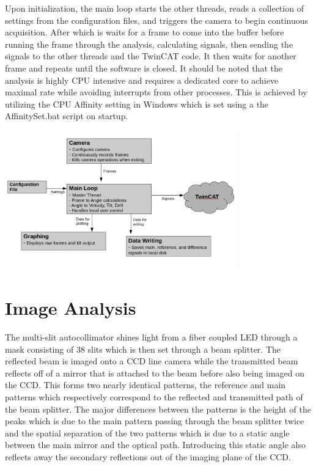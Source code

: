 \documentclass{article}
\begin{document}
Upon initialization, the main loop starts the other threads, reads a collection of settings from the configuration files, and triggers the camera to begin continuous acquisition. After which is waits for a frame to come into the buffer before running the frame through the analysis, calculating signals, then sending the signals to the other threads and the TwinCAT code. It then waits for another frame and repeats until the software is closed. It should be noted that the analysis is highly CPU intensive and requires a dedicated core to achieve maximal rate while avoiding interrupts from other processes. This is achieved by utilizing the CPU Affinity setting in Windows which is set using a the AffinitySet.bat script on startup. 
\begin{center}
\includegraphics[width=0.75\textwidth]{BRSReadoutFlow.png}\\
\end{center}

\section{Image Analysis}
The multi-slit autocollimator shines light from a fiber coupled LED through a mask consisting of 38 slits which is then set through a beam splitter. The reflected beam is imaged onto a CCD line camera while the transmitted beam reflects off of a mirror that is attached to the beam before also being imaged on the CCD. This forms two nearly identical patterns, the reference and main patterns which respectively correspond to the reflected and transmitted path of the beam splitter. The major differences between the patterns is the height of the peaks which is due to the main pattern passing through the beam splitter twice and the spatial separation of the two patterns which is due to a static angle between the main mirror and the optical path. Introducing this static angle also reflects away the secondary reflections out of the imaging plane of the CCD.\\
\end{document}
